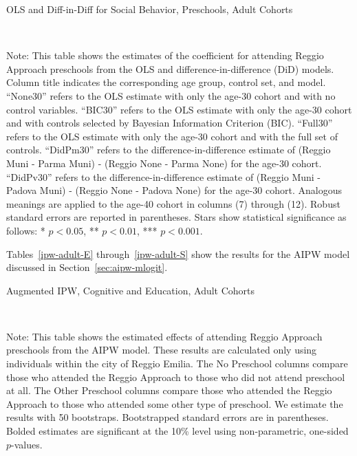 \begin{landscape}
\begin{table}[H] \caption{OLS and Diff-in-Diff for Social Behavior, Preschools, Adult Cohorts} \label{ols-S-reg}
\scalebox{0.80}{
}
\vspace{1ex} \\
\footnotesize\raggedright{Note: This table shows the estimates of the coefficient for attending Reggio Approach preschools from the OLS and difference-in-difference (DiD) models. Column title indicates the corresponding age group, control set, and model. ``None30'' refers to the OLS estimate with only the age-30 cohort and with no control variables. ``BIC30'' refers to the OLS estimate with only the age-30 cohort and with controls selected by Bayesian Information Criterion (BIC). ``Full30'' refers to the OLS estimate with only the age-30 cohort and with the full set of controls. ``DidPm30'' refers to the difference-in-difference estimate of (Reggio Muni - Parma Muni) - (Reggio None - Parma None) for the age-30 cohort. ``DidPv30'' refers to the difference-in-difference estimate of (Reggio Muni - Padova Muni) - (Reggio None - Padova None) for the age-30 cohort.  Analogous meanings are applied to the age-40 cohort in columns (7) through (12). Robust standard errors are reported in parentheses. Stars show statistical significance as follows: * $p < 0.05$, ** $p < 0.01$, *** $p < 0.001$.}
\end{table}

Tables~\ref{ipw-adult-E} through~\ref{ipw-adult-S} show the results for the AIPW model discussed in Section~\ref{sec:aipw-mlogit}. 

\begin{table}[H] \caption{Augmented IPW, Cognitive and Education, Adult Cohorts} \label{ipw-adult-E}
	
	\vspace{1ex} \\
\footnotesize\raggedright{Note: This table shows the estimated effects of attending Reggio Approach preschools from the AIPW model. These results are calculated only using individuals within the city of Reggio Emilia. The No Preschool columns compare those who attended the Reggio Approach to those who did not attend preschool at all. The Other Preschool columns compare those who attended the Reggio Approach to those who attended some other type of preschool. We estimate the results with 50 bootstraps. Bootstrapped standard errors are in parentheses. Bolded estimates are significant at the 10\% level using non-parametric, one-sided $p$-values.}
\end{table}


\end{landscape}
